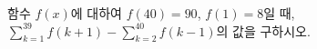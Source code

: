 함수 $f(x)$에 대하여 $f(40)=90$, $f(1)=8$일 때, $\displaystyle\sum_{k=1}^{39} f(k+1)-\sum_{k=2}^{40} f(k-1)$의 값을 구하시오.
